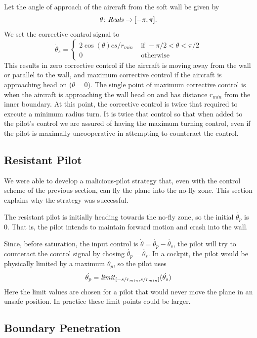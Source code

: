 \documentclass[11pt]{article}
\begin{document}
Let the angle of approach of the aircraft from the soft wall be given by
\[
\theta \colon \mbox{\textit{Reals}} \to [-\pi, \pi].
\]
We set the corrective control signal to
\[
\dot{\theta}_s = \left \{
\begin{array}{ll}
2 \cos(\theta) c s/r_{min}& \mbox{ if } -\pi / 2 < \theta < \pi / 2 \\
0 & \mbox{ otherwise}
\end{array}
\right .
\]
This results in zero corrective control if the aircraft is moving
away from the wall or parallel to the wall, and maximum corrective
control if the aircraft is approaching head on ($\theta = 0$).  
The single point
of maximum corrective control is when the aircraft is approaching
the wall head on and has distance $r_{min}$ from the inner boundary.
At this point, the corrective control is twice that required to
execute a minimum radius turn.  It is twice that control so that
when added to the pilot's control we are assured of having
the maximum turning control, even if the pilot is maximally
uncooperative in attempting to counteract the control.

\subsection{Resistant Pilot}

We were able to develop a malicious-pilot strategy that, even with the
control scheme of the previous section, can fly the plane into the no-fly zone.
This section explains why the strategy was successful.

The resistant pilot is initially heading towards the no-fly zone, so
the initial $\dot{\theta_{p}}$ is $0$.  That is, the pilot intends to
maintain forward motion and crash into the wall.

Since, before saturation, the input control is $\dot{\theta} =
\dot{\theta_{p}} - \dot{\theta_{s}}$, the pilot will try to counteract
the control signal by chosing $\dot{\theta_{p}} = \dot{\theta_{s}}$.
In a cockpit, the pilot would be physically limited by a maximum
$\dot{\theta_{p}}$, so the pilot uses
\[
\dot{\theta_{p}} = \mbox{\textit{limit}}_{[-s/r_{min},s/r_{min}]}(\dot{\theta_{s}})
\]
Here the limit values are chosen for a pilot that would never move the
plane in an unsafe position.  In practice these limit points could be
larger.

\subsection{Boundary Penetration}
\end{document}
